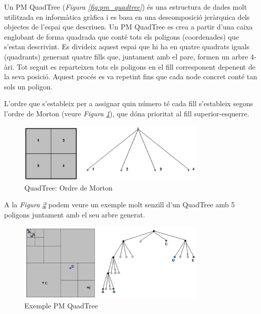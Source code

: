 \documentclass[12pt]{article}
\begin{document}
Un PM QuadTree (\textit{Figura \ref{fig:pm_quadtree}}) és una estructura de dades molt utilitzada en informàtica gràfica i es basa en una descomposició jeràrquica dels objectes de l’espai que descriuen. Un PM QuadTree es crea a partir d’una caixa englobant de forma quadrada que conté tots els poligons (coordenades) que s’estan descrivint. Es divideix aquest espai que hi ha en quatre quadrats iguals (quadrants) generant quatre fills que, juntament amb el pare, formen un arbre 4‐àri. Tot seguit es reparteixen tots els poligons en el fill corresponent depenent de la seva posició. Aquest procés es va repetint fins que cada node concret conté tan sols un poligon.

L’ordre que s’estableix per a assignar quin número té cada fill s’estableix segons l’ordre de Morton (veure \textit{Figura \ref{fig:quadtree_ordre_de_morton}}), que dóna prioritat al fill superior‐esquerre.

\begin{figure}[H]
	\centering
	\includegraphics[width=0.8\textwidth]{imatges/quadtree_ordre_de_morton.png}\par\vspace{1cm}
	\caption{QuadTree: Ordre de Morton}
	\label{fig:quadtree_ordre_de_morton}
\end{figure}

A la \textit{Figura \ref{fig:exemple_pm_quadtree}} podem veure un exemple molt senzill d’un QuadTree amb 5 poligons juntament amb el seu arbre generat.

\begin{figure}[H]
	\centering
	\includegraphics[width=0.8\textwidth]{imatges/exemple_pm_quadtree.png}\par\vspace{1cm}
	\caption{Exemple PM QuadTree}
	\label{fig:exemple_pm_quadtree}
\end{figure}
\end{document}
